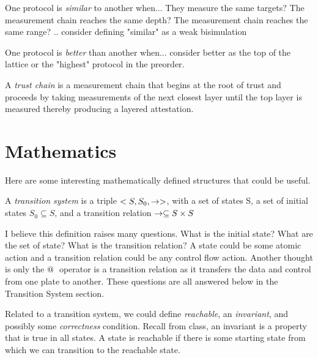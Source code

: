 \documentclass[12pt, letterpaper]{article}
\begin{document}
\begin{defn}[Similar] 
  One protocol is \emph{similar} to another when... They measure the same targets? The measurement chain reaches the same depth? The measurement chain reaches the same range? .. consider defining "similar" as a weak bisimulation
\end{defn}

\begin{defn}[Better] 
  One protocol is \emph{better} than another when... consider better as the top of the lattice or the "highest" protocol in the preorder. 
\end{defn}

\begin{defn}
  A \emph{trust chain} is a measurement chain that begins at the root of trust and proceeds by taking measurements of the next closest layer until the top layer is measured thereby producing a layered attestation. 
\end{defn}

\section{Mathematics}

Here are some interesting mathematically defined structures that could be useful. 

\begin{defn}
  A \emph{transition system} is a triple $<S,S_0, \to>$, with a set of states S, a set of initial states $S_0 \subseteq S$, and a transition relation $\to \subseteq S \times S$ \cite{FRAP}
\end{defn}

I believe this definition raises many questions. What is the initial state? What are the set of state? What is the transition relation? A state could be some atomic action and a transition relation could be any control flow action. Another thought is only the $\mathop{@_{}}{}$ operator is a transition relation as it transfers the data and control from one plate to another. These questions are all answered below in the Transition System section. 

Related to a transition system, we could define \emph{reachable}, an \emph{invariant}, and possibly some \emph{correctness} condition. Recall from class, an invariant is a property that is true in all states. A state is reachable if there is some starting state from which we can transition to the reachable state. 
\end{document}
